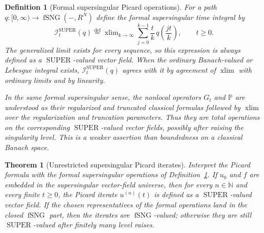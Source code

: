 \documentclass{amsart}
\newtheorem{thm}{Theorem}
\newtheorem{defn}{Definition}
\DeclareMathOperator{\xlim}{xlim}
\DeclareMathOperator{\SUPER}{SUPER}
\DeclareMathOperator{\fSNG}{fSNG}
\newcommand{\eqdef}{\overset{\mathrm{def}}{=}}
\begin{document}
\begin{defn}[Formal supersingular Picard operations]\label{def:formal-super-picard}
For a path $q:[0,\infty)\to\fSNG({-},R^N)$ define the formal supersingular
time integral by
\[
  \mathcal I_t^{\SUPER}(q)
  \eqdef
  \xlim_{k\to\infty}
  \sum_{j=0}^{k-1}\frac{t}{k}\,q\left(\frac{jt}{k}\right),
  \qquad t\geq0.
\]
The generalized limit exists for every sequence, so this expression is always
defined as a $\SUPER$-valued vector field.  When the ordinary Banach-valued or
Lebesgue integral exists, $\mathcal I_t^{\SUPER}(q)$ agrees with it by agreement
of $\xlim$ with ordinary limits and by linearity.

In the same formal supersingular sense, the nonlocal operators $G_t$ and
$\mathbb{P}$ are understood as their regularized and truncated classical
formulas followed by $\xlim$ over the regularization and truncation
parameters.  Thus they are total operations on the corresponding
$\SUPER$-valued vector fields, possibly after raising the singularity level.
This is a weaker assertion than boundedness on a classical Banach space.
\end{defn}

\begin{thm}[Unrestricted supersingular Picard iterates]
\label{thm:unrestricted-super-picard}
Interpret the Picard formula with the formal supersingular operations of
Definition~\ref{def:formal-super-picard}.  If $u_0$ and $f$ are embedded in
the supersingular vector-field universe, then for every $n\in\mathbb N$ and
every finite $t\geq0$, the Picard iterate $u^{(n)}(t)$ is defined as a
$\SUPER$-valued vector field.  If the chosen representatives of the formal
operations land in the closed $\fSNG$ part, then the iterates are
$\fSNG$-valued; otherwise they are still $\SUPER$-valued after finitely many
level raises.
\end{thm}
\end{document}
